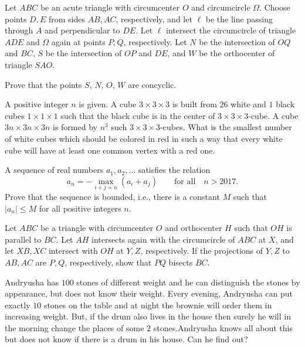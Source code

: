 \documentclass[11pt]{scrartcl}
\begin{document}
\begin{problem}[5066939379306191291]
Let $ABC$ be an acute triangle with circumcenter $O$ and circumcircle $\Omega$. Choose points $D, E$ from sides $AB, AC$, respectively, and let $\ell$ be the line passing through $A$ and perpendicular to $DE$. Let $\ell$ intersect the circumcircle of triangle $ADE$ and $\Omega$ again at points $P, Q$, respectively. Let $N$ be the intersection of $OQ$ and $BC$, $S$ be the intersection of $OP$ and $DE$, and $W$ be the orthocenter of triangle $SAO$.

Prove that the points $S$, $N$, $O$, $W$ are concyclic.
\end{problem}
\begin{problem}[457934969594281]
	A positive integer $n$ is given. A cube $3\times3\times3$ is built from $26$ white and $1$ black cubes $1\times1\times1$ such that the black cube is in the center of $3\times3\times3$-cube. A cube $3n\times 3n\times 3n$ is formed by $n^3$ such $3\times3\times3$-cubes. What is the smallest number of white cubes which should be colored in red in such a way that every white cube will have at least one common vertex with a red one.
\end{problem}
\begin{problem}[8383644831210009641]
A sequence of real numbers $a_1,a_2,\ldots$ satisfies the relation
$$a_n=-\max_{i+j=n}(a_i+a_j)\qquad\text{for all}\quad n>2017.$$Prove that the sequence is bounded, i.e., there is a constant $M$ such that $|a_n|\leq M$ for all positive integers $n$.
\end{problem}
\begin{problem}[1427062131747349943]
Let $ABC$ be a triangle with circumcenter $O$ and orthocenter $H$ such that $OH$ is parallel to $BC$. Let $AH$ intersects again with the circumcircle of $ABC$ at $X$, and let $XB, XC$ intersect with $OH$ at $Y, Z$, respectively. If the projections of $Y,Z$ to $AB,AC$ are $P,Q$, respectively, show that $PQ$ bisects $BC$.
\end{problem}
\begin{problem}[499788610931519]
	Andryusha has $100$ stones of different weight and he can distinguish the stones by appearance, but does not know their weight. Every evening, Andryusha can put exactly $10$ stones on the table and at night the brownie will order them in increasing weight. But, if the drum also lives in the house then surely he will in the morning change the places of some $2$ stones.Andryusha knows all about this but does not know if there is a drum in his house. Can he find out?
\end{problem}
\end{document}
